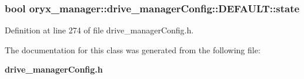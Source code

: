 \subsubsection[{state}]{\setlength{\rightskip}{0pt plus 5cm}bool {\bf oryx\-\_\-manager\-::drive\-\_\-manager\-Config\-::\-D\-E\-F\-A\-U\-L\-T\-::state}}\label{classoryx__manager_1_1drive__managerConfig_1_1DEFAULT_a8789fde9fe89be3c07033cafa55e451b}


\-Definition at line 274 of file drive\-\_\-manager\-Config.\-h.



\-The documentation for this class was generated from the following file\-:\begin{DoxyCompactItemize}
\item 
{\bf drive\-\_\-manager\-Config.\-h}\end{DoxyCompactItemize}
